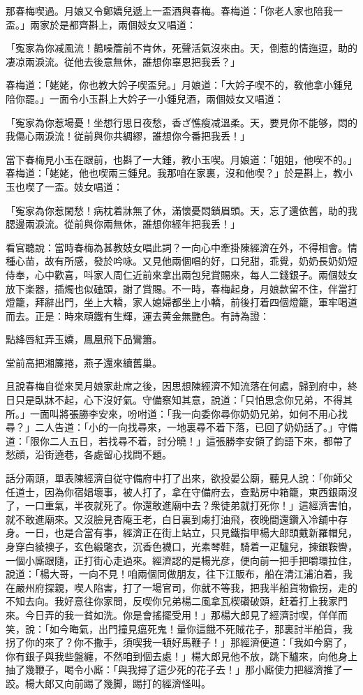 那春梅喫過。月娘又令鄭嬌兒遞上一盃酒與春梅。春梅道：「你老人家也陪我一盃。」兩家於是都齊斟上，兩個妓女又唱道：

「寃家為你减風流！鵲噪簷前不肯休，死聲活氣沒來由。天，倒惹的情迤逗，助的凄凉兩淚流。従他去後意無休，誰想你辜恩把我丢？」

春梅道：「姥姥，你也教大妗子喫盃兒。」月娘道：「大妗子喫不的，敎他拿小鍾兒陪你罷。」一面令小玉斟上大妗子一小鍾兒酒，兩個妓女又唱道：

「寃家為你惹場憂！坐想行思日夜愁，香ざ憔瘦减溫柔。天，要見你不能够，悶的我傷心兩淚流！従前與你共綢繆，誰想你今番把我丢！」

當下春梅見小玉在跟前，也斟了一大鍾，教小玉喫。月娘道：「姐姐，他喫不的。」春梅道：「姥姥，他也喫兩三鍾兒。我那咱在家裏，沒和他喫？」於是斟上，教小玉也喫了一盃。妓女唱道：

「寃家為你惹閑愁！病枕着牀無了休，滿懷憂悶鎖眉頭。天，忘了還依舊，助的我腮邊兩淚流。從前與你兩無休，誰想你經年把我丢！」

看官聽說：當時春梅為甚教妓女唱此詞？一向心中牽掛陳經濟在外，不得相會。情種心苗，故有所感，發於吟咏。又見他兩個唱的好，口兒甜，乖覺，奶奶長奶奶短侍奉，心中歡喜，呌家人周仁近前來拿出兩包兒賞賜來，每人二錢銀子。兩個妓女放下楽器，插燭也似磕頭，謝了賞賜。不一時，春梅起身，月娘款留不住，伴當打燈籠，拜辭出門，坐上大轎，家人媳婦都坐上小轎，前後打着四個燈籠，軍牢喝道而去。正是：時來頑鐵有生輝，運去黄金無艷色。有詩為證：

點絳唇紅弄玉嬌，鳳凰飛下品鸞簫。

堂前高把湘簾捲，燕子還來續舊巢。

且說春梅自從來吴月娘家赴席之後，因思想陳經濟不知流落在何處，歸到府中，終日只是臥牀不起，心下沒好氣。守備察知其意，說道：「只怕思念你兄弟，不得其所。」一面叫將張勝李安來，吩咐道：「我一向委你尋你奶奶兄弟，如何不用心找尋？」二人告道：「小的一向找尋來，一地裏尋不着下落，已回了奶奶話了。」守備道：「限你二人五日，若找尋不着，討分曉！」這張勝李安領了鈞語下來，都帶了愁顔，沿街遶巷，各處留心找問不題。

話分兩頭，單表陳經濟自従守備府中打了出來，欲投晏公廟，聽見人說：「你師父任道士，因為你宿娼壞事，被人打了，拿在守備府去，查點房中箱籠，東西銀兩沒了，一口重氣，半夜就死了。你還敢進廟中去？衆徒弟就打死你！」這經濟害怕，就不敢進廟來。又沒臉見杏庵王老，白日裏到䖏打油飛，夜晚間還鑽入冷舖中存身。一日，也是合當有事，經濟正在街上站立，只見鐵指甲楊大郎頭戴新羅帽兒，身穿白綾襖子，玄色緞氅衣，沉香色襪口，光素琴鞋，騎着一疋驢兒，揀銀鞍轡，一個小廝跟隨，正打街心走過來。經濟認的是楊光彦，便向前一把手把嚼環拉住，說道：「楊大哥，一向不見！咱兩個同做朋友，往下江販布，船在清江浦泊着，我在嚴州府探親，喫人陷害，打了一場官司，你就不等我，把我半船貨物偸拐，走的不知去向。我好意往你家問，反喫你兄弟楊二風拿瓦楔礸破頭，赶着打上我家門來。今日弄的我一貧如洗。你是會搖擺受用！」那楊大郎見了經濟討喫，佯佯而笑，說：「如今晦氣，出門撞見瘟死鬼！量你這餓不死賊花子，那裏討半船貨，我拐了你的來了？你不撒手，須喫我一頓好馬鞭子！」那經濟便道：「我如今窮了，你有銀子與我些盤纏，不然咱到個去處！」楊大郎見他不放，跳下驢來，向他身上抽了幾鞭子，喝令小廝：「與我撏了這少死的花子去！」那小廝使力把經濟推了一跤。楊大郎又向前踢了幾脚，踢打的經濟怪叫。

